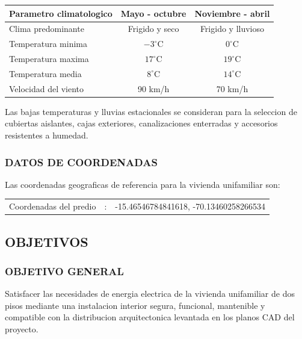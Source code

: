 \begin{center}
\begin{small}
\begin{tabular}{l c c}
\toprule
\textbf{Parametro climatologico} & \textbf{Mayo - octubre} & \textbf{Noviembre - abril} \\
\midrule
Clima predominante & Frigido y seco & Frigido y lluvioso \\
Temperatura minima & \(-3^\circ\text{C}\) & \(0^\circ\text{C}\) \\
Temperatura maxima & \(17^\circ\text{C}\) & \(19^\circ\text{C}\) \\
Temperatura media & \(8^\circ\text{C}\) & \(14^\circ\text{C}\) \\
Velocidad del viento & 90 km/h & 70 km/h \\
\bottomrule
\end{tabular}
\end{small}
\end{center}

Las bajas temperaturas y lluvias estacionales se consideran para la seleccion de cubiertas aislantes, cajas exteriores, canalizaciones enterradas y accesorios resistentes a humedad.

\subsubsection{DATOS DE COORDENADAS}

Las coordenadas geograficas de referencia para la vivienda unifamiliar son:

\begin{center}
\begin{tabular}{p{2.20in}c p{2.65in}}
Coordenadas del predio & : & -15.46546784841618, -70.13460258266534 \\
\end{tabular}
\end{center}

\subsection{OBJETIVOS}

\subsubsection{OBJETIVO GENERAL}

Satisfacer las necesidades de energia electrica de la vivienda unifamiliar de dos pisos mediante una instalacion interior segura, funcional, mantenible y compatible con la distribucion arquitectonica levantada en los planos CAD del proyecto.

